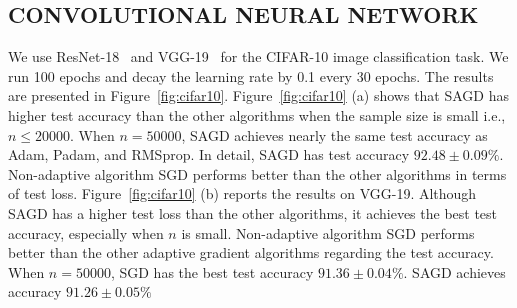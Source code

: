 \documentclass[11pt]{article}
\begin{document}
\subsection{CONVOLUTIONAL NEURAL NETWORK} \label{subsec: cnn}
We use ResNet-18~\citep{hezh2016} and VGG-19~\citep{sizi2014} for the CIFAR-10 image classification task. We run 100 epochs and decay the learning rate by 0.1 every 30 epochs. 
The results are presented in Figure~\ref{fig:cifar10}. Figure~\ref{fig:cifar10} (a) shows that SAGD has higher test accuracy than the 
other algorithms when the sample size is small i.e., $n \leq 20000$.
When $n = 50000$, SAGD achieves nearly the same test accuracy as Adam, Padam, and RMSprop. In detail, SAGD has test accuracy $92.48 \pm 0.09\%$.
Non-adaptive algorithm 
SGD performs better than the other algorithms in terms of test loss. 
Figure~\ref{fig:cifar10} (b) reports the results on VGG-19. Although SAGD has a higher test loss than the other algorithms, it achieves the best test accuracy, especially when $n$ is small. Non-adaptive algorithm SGD performs better than the other adaptive gradient algorithms regarding the test accuracy.
When $n= 50000$, SGD has the best test accuracy $91.36 \pm 0.04\%$. SAGD achieves accuracy $91.26 \pm 0.05\%$


\end{document}
